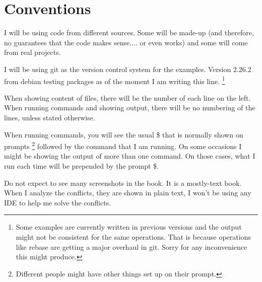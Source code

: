 
\section{Conventions}

I will be using code from different sources. Some will be made-up (and therefore, no guarantees that the code makes sense....
or even works) and some will come from real projects.

I will be using git as the version control system for the examples. Version 2.26.2 from debian testing packages as of the
moment I am writing this line. \footnote{Some examples are currently written in previous versions and the output might not
be consistent for the same operations. That is because operations like rebase are getting a major overhaul in git. Sorry for
any inconvenience this might produce.}

When showing content of files, there will be the number of each line on the left. When running commands and showing output, there
will be no numbering of the lines, unless stated otherwise.

When running commands, you will see the usual \$ that is normally shown on prompts \footnote{Different people might have other
things set up on their prompt.} followed by the command that I am running. On some occasions I might be showing the output of more
than one command. On those cases, what I run each time will be prepended by the prompt \$.

Do not expect to see many screenshots in the book. It is a mostly-text book. When I analyze the conflicts, they are shown in plain
text, I won't be using any IDE to help me solve the conflicts.

